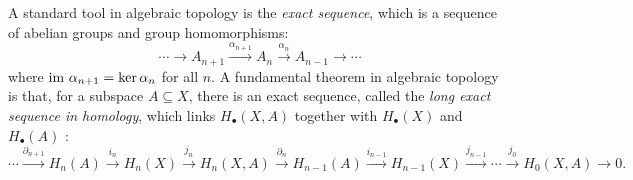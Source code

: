 \documentclass[11pt]{article}
\begin{document}
A standard tool in algebraic topology is the {\em exact sequence}, which is a sequence of abelian groups  and group homomorphisms:
\[
\cdots \to A_{n+1}\xrightarrow{\alpha_{n+1}}
A_n \xrightarrow{\alpha_n}
A_{n-1} \to \cdots
\]
where $\text{im } \alpha_{n+1} = \ker\alpha_n$ for all $n$.
A fundamental theorem in algebraic topology is that, for a subspace $A\subseteq X$, there is an exact sequence, called the \emph{long exact sequence in homology}, which links $H_\bullet(X,A)$ together with $H_\bullet(X)$ and $H_\bullet(A)$ \citep{hatcher}:
\[
\cdots \xrightarrow{\partial_{n+1}} H_n(A)\xrightarrow{i_n} H_n(X)\xrightarrow{j_n} H_n(X,A)\xrightarrow{\partial_n} 
H_{n-1}(A)\xrightarrow{i_{n-1}} H_{n-1}(X)\xrightarrow{j_{n-1}} \cdots 
\xrightarrow{j_0} H_0(X,A)\to 0.
\]
\end{document}
